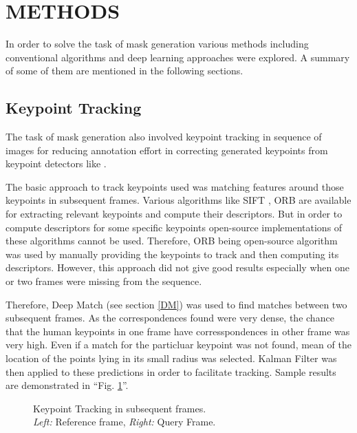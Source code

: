 \documentclass[conference]{IEEEtran}
\begin{document}
\section{METHODS}
In order to solve the task of mask generation various methods including conventional algorithms and deep learning approaches were explored. A summary of some of them are mentioned in the following sections. 

\subsection{Keypoint Tracking}
The task of mask generation also involved keypoint tracking in sequence of images for reducing annotation effort in correcting generated keypoints from keypoint detectors like \cite{poseAE}.

The basic approach to track keypoints used was matching features around those keypoints in subsequent frames. Various algorithms like SIFT \cite{sift}, ORB \cite{orb} are available for extracting relevant keypoints and compute their descriptors. But in order to compute descriptors for some specific keypoints open-source implementations of these algorithms cannot be used. Therefore, ORB being open-source algorithm was used by manually providing the keypoints to track and then computing its descriptors. However, this approach did not give good results especially when one or two frames were missing from the sequence. 

Therefore, Deep Match (see section \ref{DM}) was used to find matches between two subsequent frames. As the correspondences found were very dense, the chance that the human keypoints in one frame have corresspondences in other frame was very high. Even if a match for the particluar keypoint was not found, mean of the location of the points lying in its small radius was selected. Kalman Filter was then applied to these predictions in order to facilitate tracking. Sample results are demonstrated in ``Fig. \ref{fig:dm}''.

\begin{figure}[htbp]
\caption{ Keypoint Tracking in subsequent frames. \\ \textit{Left:} Reference frame, \textit{Right:} Query Frame.}
\label{fig:dm}
\end{figure}
\end{document}
